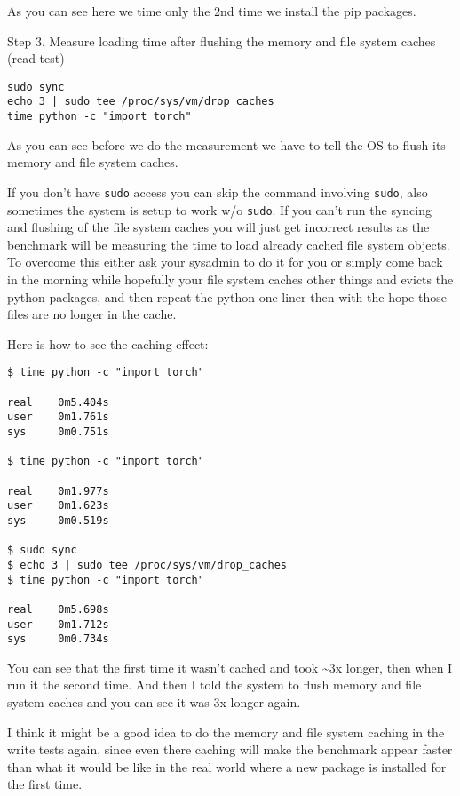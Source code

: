 \documentclass[
]{report}
\begin{document}
As you can see here we time only the 2nd time we install the pip
packages.

Step 3. Measure loading time after flushing the memory and file system
caches (read test)

\begin{verbatim}
sudo sync
echo 3 | sudo tee /proc/sys/vm/drop_caches
time python -c "import torch"
\end{verbatim}

As you can see before we do the measurement we have to tell the OS to
flush its memory and file system caches.

If you don't have \texttt{sudo} access you can skip the command
involving \texttt{sudo}, also sometimes the system is setup to work w/o
\texttt{sudo}. If you can't run the syncing and flushing of the file
system caches you will just get incorrect results as the benchmark will
be measuring the time to load already cached file system objects. To
overcome this either ask your sysadmin to do it for you or simply come
back in the morning while hopefully your file system caches other things
and evicts the python packages, and then repeat the python one liner
then with the hope those files are no longer in the cache.

Here is how to see the caching effect:

\begin{verbatim}
$ time python -c "import torch"

real    0m5.404s
user    0m1.761s
sys     0m0.751s

$ time python -c "import torch"

real    0m1.977s
user    0m1.623s
sys     0m0.519s

$ sudo sync
$ echo 3 | sudo tee /proc/sys/vm/drop_caches
$ time python -c "import torch"

real    0m5.698s
user    0m1.712s
sys     0m0.734s
\end{verbatim}

You can see that the first time it wasn't cached and took
\textasciitilde3x longer, then when I run it the second time. And then I
told the system to flush memory and file system caches and you can see
it was 3x longer again.

I think it might be a good idea to do the memory and file system caching
in the write tests again, since even there caching will make the
benchmark appear faster than what it would be like in the real world
where a new package is installed for the first time.
\end{document}
